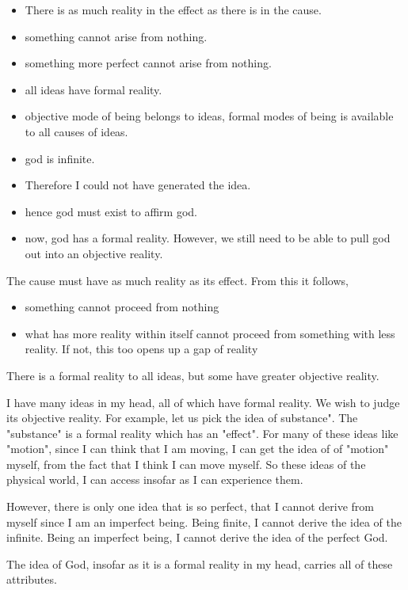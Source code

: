 \documentclass[11pt]{book}
\begin{document}
\begin{itemize}
    \item There is as much reality in the effect as there is in the cause.
    \item something cannot arise from nothing.
    \item something more perfect cannot arise from nothing.
    \item all ideas have formal reality.
    \item objective mode of being belongs to ideas, formal modes of being
          is available to all causes of ideas.
    \item god is infinite.
    \item Therefore I could not have generated the idea.
    \item hence god must exist to affirm god.
    \item now, god has a formal reality. However, we still need to be able to
          pull god out into an objective reality.
\end{itemize}

The cause must have as much reality as its effect. From this it follows,

\begin{itemize}
    \item something cannot proceed from nothing
    \item what has more reality within itself cannot proceed from something
        with less reality. If not, this too opens up a gap of reality
\end{itemize}

There is a formal reality to all ideas, but some have greater objective reality.

I have many ideas in my head, all of which have formal reality. We wish to
judge its objective reality. For example, let us pick the idea of substance".
The "substance" is a formal reality which has an "effect". For many of these
ideas like "motion", since I can think that I am moving, I can get the idea of
of "motion" myself, from the fact that I think I can move myself. So these
ideas of the physical world, I can access insofar as I can experience them.

However, there is only one idea that is so perfect, that I cannot derive from
myself since I am an imperfect being. Being finite, I cannot derive the idea of
the infinite. Being an imperfect being, I cannot derive the idea of the perfect
God.

The idea of God, insofar as it is a formal reality in my head, carries all of
these attributes. 
\end{document}
